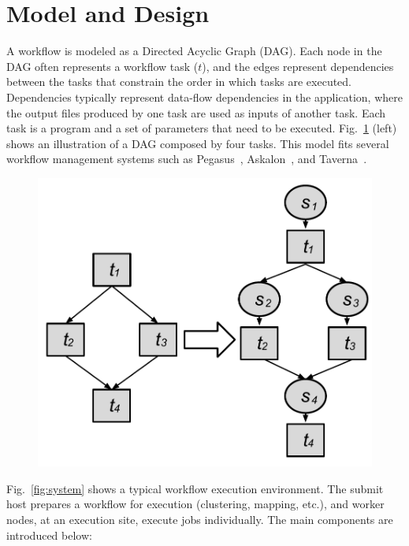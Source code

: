 \documentclass[final]{IEEEtran}
\begin{document}
\section{Model and Design}
\label{sec:model}


A workflow is modeled as a Directed Acyclic Graph (DAG). Each node in the DAG often represents a workflow task ($t$), and the edges represent dependencies between the tasks that constrain the order in which tasks are executed. Dependencies typically represent data-flow dependencies in the application, where the output files produced by one task are used as inputs of another task. Each task is a program and a set of parameters that need to be executed. Fig.~\ref{fig:odag} (left) shows an illustration of a DAG composed by four tasks. This model fits several workflow management systems such as Pegasus~\cite{Deelman:2005:PFM:1239649.1239653}, Askalon~\cite{Fahringer:2005:ATS:1064323.1064331}, and Taverna~\cite{Oinn:2006:TLC:1148437.1148448}.

\begin{figure}[htb]
	\centering
	\includegraphics[width=0.7\linewidth]{figure/odag.pdf}
	\label{fig:odag}
	\vspace{-15pt}
\end{figure}

Fig.~\ref{fig:system} shows a typical workflow execution environment. The submit host prepares a workflow for execution (clustering, mapping, etc.), and worker nodes, at an execution site, execute jobs individually. The main components are introduced below:
\end{document}
